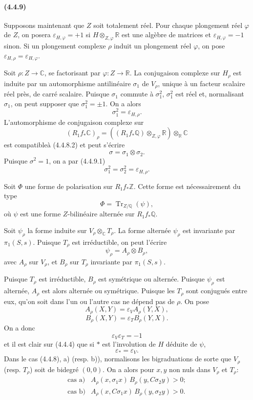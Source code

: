\documentclass[10pt]{article}
\newcommand{\C}{\mathbb C}
\newcommand{\Q}{\mathbb Q}
\newcommand{\Z}{\mathbb Z}
\newcommand{\fg}{\guillemotright}
\newcommand{\og}{\guillemotleft}
\newcommand{\R}{\mathbb R}
\newcommand{\Tr}{\operatorname{Tr}}
\begin{document}

\paragraph{(4.4.9)} Supposons maintenant que $Z$ soit totalement réel. Pour chaque plongement réel $\varphi$ de $Z$, on posera $\varepsilon_{H,\varphi}=+1$ si $H\otimes_{Z,\varphi}\R$ est une algèbre de matrices et $\varepsilon_{H,\varphi}=-1$ sinon. Si un plongement complexe $\rho$ induit un plongement réel $\varphi$, on pose $\varepsilon_{H,\rho}=\varepsilon_{H,\varphi}$.

Soit $\rho:Z\to\C$, se factorisant par $\varphi:Z\to\R$. La conjugaison complexe sur $H_\rho$ est induite par un automorphisme antilinéaire $\sigma_1$ de $V_\rho$, unique à un facteur scalaire réel près, de carré scalaire. Puisque $\sigma_1$ commute à $\sigma_1^2$, $\sigma_1^2$ est réel et, normalisant $\sigma_1$, on peut supposer que $\sigma_1^2=\pm1$. On a alors
\[
\tag{4.4.9.1}
\sigma_1^2=\varepsilon_{H,\rho}.
\]
L'automorphisme de conjugaison complexe sur
\[
(R_1f_*\C)_\rho=((R_1f_*\Q)\otimes_{Z,\varphi}\R)\otimes_\R\C
\]
est \og compatible\fg à (4.4.8.2) et peut s'écrire
\[
\sigma=\sigma_1\otimes\sigma_2.
\]
Puisque $\sigma^2=1$, on a par (4.4.9.1)
\[
\tag{4.4.9.2}
\sigma_1^2=\sigma_2^2=\varepsilon_{H,\rho}.
\]

Soit $\Phi$ une forme de polarisation sur $R_1f_*\Z$. Cette forme est nécessairement du type
\[
\Phi=\Tr_{Z/\Q}(\psi),
\]
où $\psi$ est une forme $Z$-bilinéaire alternée sur $R_1f_*\Q$.

Soit $\psi_\rho$ la forme induite sur $V_\rho\otimes_\C T_\rho$. La forme alternée $\psi_\rho$ est invariante par $\pi_1(S,s)$. Puisque $T_\rho$ est irréductible, on peut l'écrire
\[
\tag{4.4.9.3}
\psi_\rho=A_\rho\otimes B_\rho,
\]
avec $A_\rho$ sur $V_\rho$, et $B_\rho$ sur $T_\rho$ invariante par $\pi_1(S,s)$.

Puisque $T_\rho$ est irréductible, $B_\rho$ est symétrique ou alternée. Puisque $\psi_\rho$ est alternée, $A_\rho$ est alors alternée ou symétrique. Puisque les $T_\rho$ sont conjugués entre eux, qu'on soit dans l'un ou l'autre cas ne dépend pas de $\rho$. On pose
\[
\tag{4.4.9.4}
A_\rho(X,Y)=\varepsilon_V A_\rho(Y,X),
\]
\[
\tag{4.4.9.5}
B_\rho(X,Y)=\varepsilon_T B_\rho(Y,X).
\]
On a donc
\[
\tag{4.4.9.6}
\varepsilon_V\varepsilon_T=-1
\]
et il est clair sur (4.4.4) que si $*$ est l'involution de $H$ déduite de $\psi$,
\[
\tag{4.4.9.7}
\varepsilon_*=\varepsilon_V.
\]
Dans le cas (4.4.8), a) (resp. b)), normalisons les bigraduations de sorte que $V_\rho$ (resp. $T_\rho$) soit de bidegré $(0,0)$. On a alors pour $x,y$ non nuls dans $V_\rho$ et $T_\rho$:
\[
\begin{array}{ll}
\text{cas a)}& A_\rho(x,\sigma_1x)\,B_\rho(y,C\sigma_2y)>0;\\[0.3em]
\text{cas b)}& A_\rho(x,C\sigma_1x)\,B_\rho(y,\sigma_2y)>0.
\end{array}
\]
\end{document}
